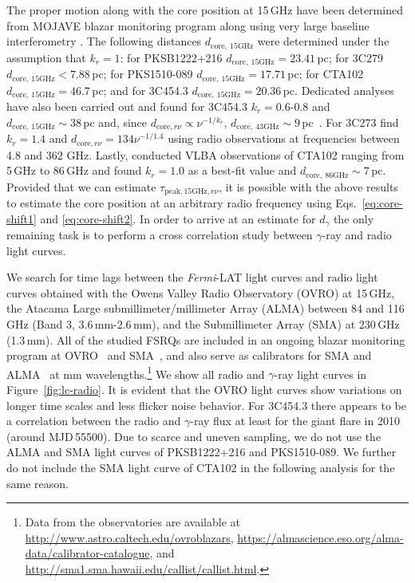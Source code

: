 \documentclass[twocolumn,linenumbers]{aastex62}
\newcommand{\gray}{$\gamma$-ray\xspace}
\newcommand{\fermiLAT}{\emph{Fermi}-LAT\xspace}
\begin{document}
The proper motion along with the core position at 15\,GHz have been determined from
MOJAVE blazar monitoring program along using very large baseline interferometry \citep[VLBI][]{2012A&A...545A.113P,2016AJ....152...12L}.
The following distances $d_\mathrm{core,~15GHz}$ were determined  under the assumption that $k_r = 1$: for PKSB1222+216 $d_\mathrm{core,~15GHz}= 23.41\,$pc; for 3C279 $d_\mathrm{core,~15GHz}<7.88$\,pc; for PKS1510-089 $d_\mathrm{core,~15GHz} = 17.71\,$pc; for 
CTA102 $d_\mathrm{core,~15GHz} =46.7\,$pc; and for 3C454.3 $d_\mathrm{core,~15GHz} = 20.36\,$pc.
Dedicated analyses have also been carried out and found for 3C454.3 $k_r = 0.6$-$0.8$ and $d_\mathrm{core,~15GHz} \sim 38\,$pc and, since $d_{\mathrm{core},r\nu}\propto\nu^{-1/k_r}$,  $d_\mathrm{core,~43GHz} \sim 9\,$pc~\citep{2014MNRAS.437.3396K}. 
For 3C273 \citet{2013ARep...57...34V} find $k_r = 1.4$ and $d_{\mathrm{core},r\nu} = 134\nu^{-1/1.4}$ using radio observations at frequencies between 4.8 and 362 GHz.
Lastly, \citet{2015A&A...576A..43F} conducted VLBA observations of CTA102 ranging from 5\,GHz to 86\,GHz and found $k_r = 1.0$ as a best-fit value and $d_{\mathrm{core,~86GHz}}\sim7\,$pc.
Provided that we can estimate $\tau_{\mathrm{peak,15GHz},r\nu}$, it is possible with the above results to estimate the core position at an arbitrary radio frequency using Eqs.~\ref{eq:core-shift1} and \ref{eq:core-shift2}.
In order to arrive at an estimate for $d_\gamma$ the only remaining task is to perform a cross correlation study between \gray and radio light curves.

We search for time lags between the \fermiLAT light curves and radio light curves obtained with the Owens Valley Radio Observatory (OVRO) at 15\,GHz, the Atacama Large submillimeter/millimeter Array (ALMA) between 84 and 116\,GHz (Band 3, 3.6\,mm-2.6\,mm), and the Submillimeter Array (SMA) at 230\,GHz (1.3\,mm). 
All of the studied FSRQs are included in an ongoing blazar monitoring program at OVRO~\citep{2011ApJS..194...29R} and SMA~\citep{2007ASPC..375..234G}, and also serve as calibrators for SMA and ALMA~\citep{2018MNRAS.478.1512B} at mm wavelengths.\footnote{Data from the observatories are available at \url{http://www.astro.caltech.edu/ovroblazars}, \url{https://almascience.eso.org/alma-data/calibrator-catalogue}, and \url{http://sma1.sma.hawaii.edu/callist/callist.html}.}
We show all radio and \gray light curves in Figure~\ref{fig:lc-radio}.
It is evident that the OVRO light curves show variations on longer time scales and less flicker noise behavior. 
For 3C454.3 there appears to be a correlation between the radio and \gray flux at least for the giant flare in 2010 (around MJD\,55500). 
Due to scarce and uneven sampling, we do not use the ALMA and SMA light curves of PKSB1222+216 and PKS1510-089.
We further do not include the SMA light curve of CTA102 in the following analysis for the same reason.
\end{document}

